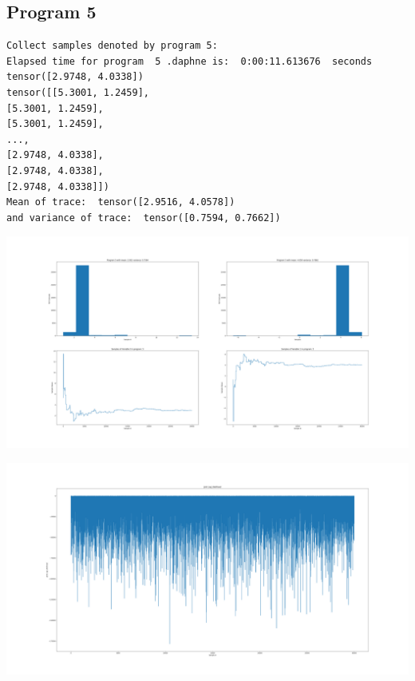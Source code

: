 \documentclass[]{article}
\begin{document}
\subsection{Program 5}
\begin{verbatim}
Collect samples denoted by program 5:
Elapsed time for program  5 .daphne is:  0:00:11.613676  seconds
tensor([2.9748, 4.0338])
tensor([[5.3001, 1.2459],
[5.3001, 1.2459],
[5.3001, 1.2459],
...,
[2.9748, 4.0338],
[2.9748, 4.0338],
[2.9748, 4.0338]])
Mean of trace:  tensor([2.9516, 4.0578])  
and variance of trace:  tensor([0.7594, 0.7662])
\end{verbatim}
\begin{center}
	\includegraphics[width=\linewidth]{Figures/p5_IS.png}
\end{center}
\begin{center}
	\includegraphics[width=\linewidth]{Figures/p5_ISjll.png}
\end{center}
\end{document}
